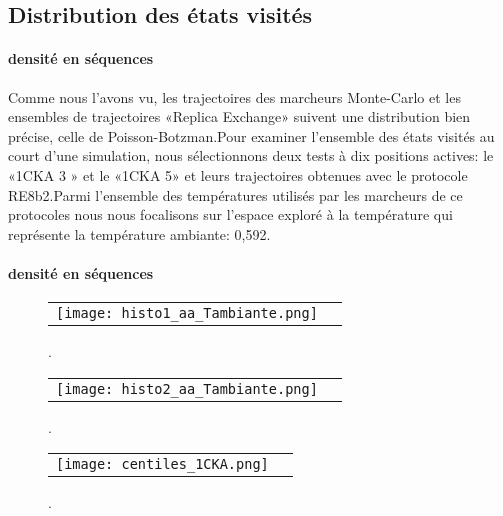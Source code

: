     \clearpage
   \subsection{Distribution des états visités }
   \paragraph{densité en séquences}
Comme nous l'avons vu, les trajectoires des marcheurs Monte-Carlo et les ensembles de trajectoires «Replica Exchange»  suivent une distribution bien précise, celle de Poisson-Botzman.Pour examiner l'ensemble des états visités au court d'une simulation, nous sélectionnons deux tests à dix positions actives: le «1CKA 3 » et le «1CKA 5» et leurs trajectoires obtenues avec le protocole RE8b2.Parmi l'ensemble des températures utilisés par les marcheurs de ce protocoles nous nous focalisons sur l'espace exploré à la température qui représente la température ambiante: 0,592. 

   \paragraph{densité en séquences}

    \begin{figure}[h]
      \centering
      \begin{tabular}{cc} 
        \texttt{[image: histo1\_aa\_Tambiante.png]} &
      \end{tabular}
      
      \caption{.}
\label{graph:densité_en_séquences1}
    \end{figure}


    \begin{figure}[h]
      \centering
      \begin{tabular}{cc} 
        \texttt{[image: histo2\_aa\_Tambiante.png]} &
      \end{tabular}
      
      \caption{.}
\label{graph:densité_en_séquences2}
    \end{figure}

    \clearpage

    \begin{figure}[h]
      \centering
      \begin{tabular}{cc} 
        \texttt{[image: centiles\_1CKA.png]} &
      \end{tabular}
      
      \caption{.}
\label{graph:densité_en_séquences1}
    \end{figure}

    \clearpage




